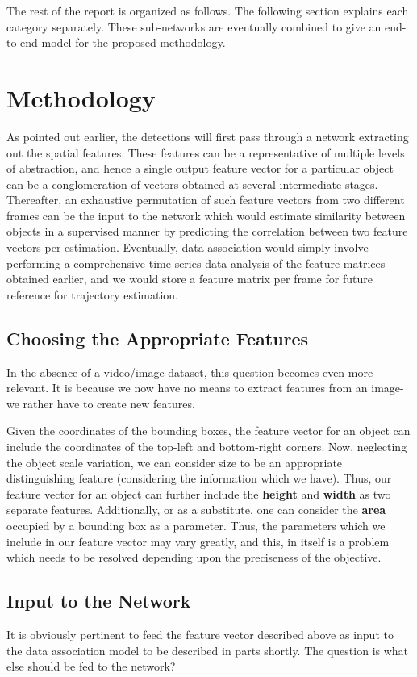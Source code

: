 \documentclass[a4paper]{article}
\begin{document}
    The rest of the report is organized as follows. The following section explains each category separately. These sub-networks are eventually combined to give an end-to-end model for the proposed methodology.

\section{Methodology}
    As pointed out earlier, the detections will first pass through a network extracting out the spatial features. These features can be a representative of multiple levels of abstraction, and hence a single output feature vector for a particular object can be a conglomeration of vectors obtained at several intermediate stages. Thereafter, an exhaustive permutation of such feature vectors from two different frames can be the input to the network which would estimate similarity between objects in a supervised manner by predicting the correlation between two feature vectors per estimation. Eventually, data association would simply involve performing a comprehensive time-series data analysis of the feature matrices obtained earlier, and we would store a feature matrix per frame for future reference for trajectory estimation.
    
    \subsection{Choosing the Appropriate Features}
    In the absence of a video/image dataset, this question becomes even more relevant. It is because we now have no means to extract features from an image- we rather have to create new features.

    Given the coordinates of the bounding boxes, the feature vector for an object can include the coordinates of the top-left and bottom-right corners. Now, neglecting the object scale variation, we can consider size to be an appropriate distinguishing feature (considering the information which we have). Thus, our feature vector for an object can further include the \textbf{height} and \textbf{width} as two separate features. Additionally, or as a substitute, one can consider the \textbf{area} occupied by a bounding box as a parameter. Thus, the parameters which we include in our feature vector may vary greatly, and this, in itself is a problem which needs to be resolved depending upon the preciseness of the objective.
    
    \subsection{Input to the Network}
    It is obviously pertinent to feed the feature vector described above as input to the data association model to be described in parts shortly. The question is what else should be fed to the network?
\end{document}
